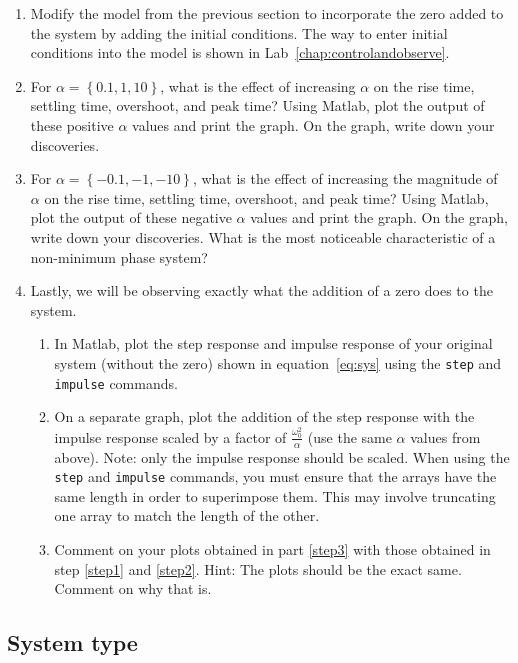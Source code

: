 \begin{enumerate}
\item Modify the model from the previous section to incorporate the zero
added to the system by adding the initial conditions. The way to enter
initial conditions into the model is shown in
Lab~\ref{chap:controlandobserve}\@.

\item For $\alpha = \left\{0.1, 1, 10\right\}$, what is the effect of increasing
$\alpha$ on the rise time, settling time, overshoot, and peak
time?  Using \textsf{Matlab}, plot the output of these positive
$\alpha$ values and print the graph.  On the graph, write down your
discoveries. \label{step1}

\item For $\alpha = \left\{-0.1, -1, -10\right\}$, what is the effect of increasing the
magnitude of $\alpha$ on the rise time, settling time, overshoot,
and peak time? Using \textsf{Matlab}, plot the output of these negative $\alpha$ values and print the graph.  On the graph, write down
your discoveries.  What is the most noticeable characteristic of a
non-minimum phase system?  \label{step2}
\item\label{step:superposition} Lastly, we will be observing exactly what the addition of a zero does 
to the system. 
\begin{enumerate}
\item In Matlab, plot the step response and impulse response of your 
original system (without the zero) shown in equation~\ref{eq:sys} using the \verb|step| and 
\verb|impulse| commands. 
\item \label{step3} On a separate graph, plot the addition of the step response with 
the impulse response scaled by a factor of $\frac{\omega_0^2}{\alpha}$ (use the same $\alpha$ values from above). Note: only the impulse response should be scaled. When using the 
\verb|step| and \verb|impulse| commands, you must ensure that the arrays have the same length in 
order to superimpose them. This may involve truncating one array to match the length of the other. 
\item Comment on your plots obtained in part \ref{step3} with those obtained in step \ref{step1} and \ref{step2}. Hint: The plots should be the exact same. Comment on why that is.
\end{enumerate}
\end{enumerate}

\subsection{System type}

